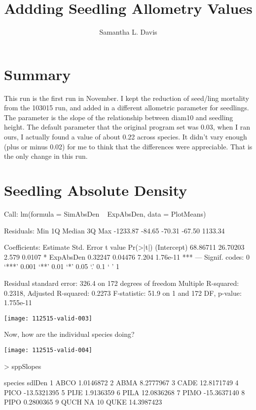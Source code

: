 \documentclass{article}
\begin{document}


\title{Addding Seedling Allometry Values}
\author{Samantha L. Davis}

\maketitle

\section{Summary}
This run is the first run in November. I kept the reduction of seed/ling mortality from the 103015 run, and added in a different allometric parameter for seedlings. The parameter is the slope of the relationship between diam10 and seedling height. The default parameter that the original program set was 0.03, when I ran ours, I actually found a value of about 0.22 across species. It didn't vary enough (plus or minus 0.02) for me to think that the differences were appreciable. That is the only change in this run.





\newpage

\section{Seedling Absolute Density}
\begin{Schunk}
\begin{Soutput}
Call:
lm(formula = SimAbsDen ~ ExpAbsDen, data = PlotMeans)

Residuals:
     Min       1Q   Median       3Q      Max 
-1233.87   -84.65   -70.31   -67.50  1133.34 

Coefficients:
            Estimate Std. Error t value Pr(>|t|)    
(Intercept) 68.86711   26.70203   2.579   0.0107 *  
ExpAbsDen    0.32247    0.04476   7.204 1.76e-11 ***
---
Signif. codes:  0 ‘***’ 0.001 ‘**’ 0.01 ‘*’ 0.05 ‘.’ 0.1 ‘ ’ 1

Residual standard error: 326.4 on 172 degrees of freedom
Multiple R-squared:  0.2318,	Adjusted R-squared:  0.2273 
F-statistic:  51.9 on 1 and 172 DF,  p-value: 1.755e-11
\end{Soutput}
\end{Schunk}
\texttt{[image: 112515-valid-003]}

Now, how are the individual species doing?

\texttt{[image: 112515-valid-004]}
\begin{Schunk}
\begin{Sinput}
>   sppSlopes
\end{Sinput}
\begin{Soutput}
   species      sdlDen
1     ABCO   1.0146872
2     ABMA   8.2777967
3     CADE  12.8171749
4     PICO -13.5321395
5     PIJE   1.9136359
6     PILA  12.0836268
7     PIMO -15.3637140
8     PIPO   0.2800365
9     QUCH          NA
10    QUKE  14.3987423
\end{Soutput}
\end{Schunk}
\end{document}
